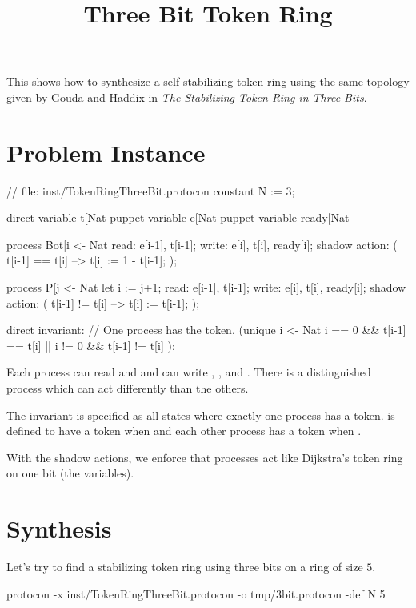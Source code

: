 
\title{Three Bit Token Ring}
\date{}



This shows how to synthesize a self-stabilizing token ring using the same topology given by 
Gouda and Haddix in \textit{The Stabilizing Token Ring in Three Bits}.

\section{Problem Instance}

\begin{code}
// file: inst/TokenRingThreeBit.protocon
constant N := 3;

direct variable t[Nat %
puppet variable e[Nat %
puppet variable ready[Nat %

process Bot[i <- Nat %
{
  read:  e[i-1], t[i-1];
  write: e[i], t[i], ready[i];
  shadow action: ( t[i-1] == t[i] --> t[i] := 1 - t[i-1]; );
}

process P[j <- Nat %
{
  let i := j+1;
  read:  e[i-1], t[i-1];
  write: e[i], t[i], ready[i];
  shadow action: ( t[i-1] != t[i] --> t[i] := t[i-1]; );
}

direct invariant:
  // One process has the token.
  (unique i <- Nat %
   i == 0 && t[i-1] == t[i]
   ||
   i != 0 && t[i-1] != t[i]
  );
\end{code}

Each process can read  and  and can write , , and .
There is a distinguished process  which can act differently than the others.

The invariant is specified as all states where exactly one process has a token.
 is defined to have a token when  and each other  process has a token when .

With the shadow actions, we enforce that processes act like Dijkstra's token ring on one bit (the  variables).

\section{Synthesis}

Let's try to find a stabilizing token ring using three bits on a ring of size $5$.
\begin{code}
protocon -x inst/TokenRingThreeBit.protocon -o tmp/3bit.protocon -def N 5
\end{code}

